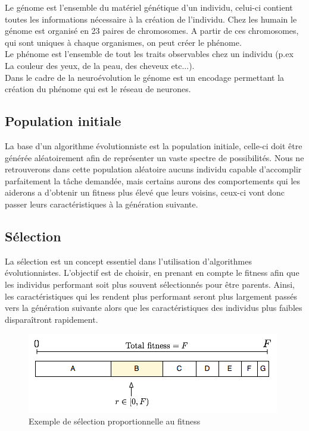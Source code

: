 \documentclass{article}
\begin{document}
Le génome est l'ensemble du matériel génétique d'un individu, celui-ci contient toutes les informations nécessaire à la création de l'individu.\cite{wikigenome} Chez les humain le génome est organisé en 23 paires de chromosomes. A partir de ces chromosomes, qui sont uniques à chaque organismes, on peut créer le phénome.\\
Le phénome est l'ensemble de tout les traits observables chez un individu (p.ex La couleur des yeux, de la peau, des cheveux etc...).\cite{wikiphenome}\\

Dans le cadre de la neuroévolution le génome est un encodage permettant la création du phénome qui est le réseau de neurones.

\subsection{Population initiale}

La base d'un algorithme évolutionniste est la population initiale, celle-ci doit être générée aléatoirement afin de représenter un vaste spectre de possibilités. 
Nous ne retrouverons dans cette population aléatoire aucuns individu capable d'accomplir parfaitement la tâche demandée, mais certains aurons des comportements qui les aiderons a d'obtenir un fitness plus élevé que leurs voisins, ceux-ci vont donc passer leurs caractéristiques à la génération suivante.

\subsection{Sélection}

La sélection est un concept essentiel dans l'utilisation d'algorithmes évolutionnistes. L'objectif est de choisir, en prenant en compte le fitness afin que les individus performant soit plus souvent sélectionnés pour être parents. Ainsi, les caractéristiques qui les rendent plus performant seront plus largement passés vers la génération suivante alors que les caractéristiques des individus plus faibles disparaîtront rapidement.\cite{wikifps}

\begin{figure}[h]
\begin{center}
	\includegraphics[scale=0.6]{fps.png} 
	\caption{Exemple de sélection proportionnelle au fitness\cite{wikifps}}
\end{center}
\end{figure}
\newpage
\end{document}
